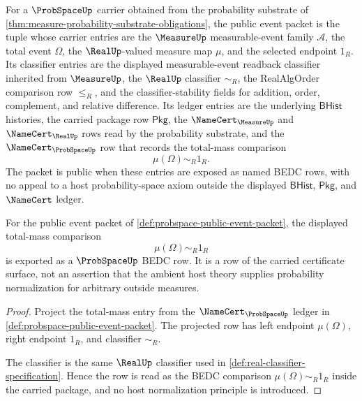\begin{definition}
\label{def:probspace-public-event-packet}
For a $\ProbSpaceUp$ carrier obtained from the probability substrate of \autoref{thm:measure-probability-substrate-obligations}, the public event packet is the tuple whose carrier entries are the $\MeasureUp$ measurable-event family $\mathcal{A}$, the total event $\Omega$, the $\RealUp$-valued measure map $\mu$, and the selected endpoint $1_R$. Its classifier entries are the displayed measurable-event readback classifier inherited from $\MeasureUp$, the $\RealUp$ classifier $\sim_R$, the RealAlgOrder comparison row $\le_R$, and the classifier-stability fields for addition, order, complement, and relative difference. Its ledger entries are the underlying $\mathsf{BHist}$ histories, the carried package row $\mathsf{Pkg}$, the $\NameCert_{\MeasureUp}$ and $\NameCert_{\RealUp}$ rows read by the probability substrate, and the $\NameCert_{\ProbSpaceUp}$ row that records the total-mass comparison
$$
\mu(\Omega)\sim_R1_R.
$$
The packet is public when these entries are exposed as named BEDC rows, with no appeal to a host probability-space axiom outside the displayed $\mathsf{BHist}$, $\mathsf{Pkg}$, and $\NameCert$ ledger.
\end{definition}

\begin{theorem}
\label{thm:probspace-total-event-normalization-row}
For the public event packet of \autoref{def:probspace-public-event-packet}, the displayed total-mass comparison
$$
\mu(\Omega)\sim_R1_R
$$
is exported as a $\ProbSpaceUp$ BEDC row. It is a row of the carried certificate surface, not an assertion that the ambient host theory supplies probability normalization for arbitrary outside measures.
\end{theorem}
\begin{proof}
Project the total-mass entry from the $\NameCert_{\ProbSpaceUp}$ ledger in \autoref{def:probspace-public-event-packet}. The projected row has left endpoint $\mu(\Omega)$, right endpoint $1_R$, and classifier $\sim_R$.

The classifier is the same $\RealUp$ classifier used in \autoref{def:real-classifier-specification}. Hence the row is read as the BEDC comparison $\mu(\Omega)\sim_R1_R$ inside the carried package, and no host normalization principle is introduced.
\end{proof}

